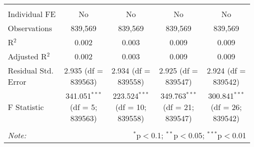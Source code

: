 \documentclass[
]{article}
\begin{document}
\begin{table}[!htbp]
{\begin{tabular}{@{\extracolsep{5pt}}lcccc}
  & & & & \\ 
\hline \\[-1.8ex] 
Individual FE & No & No & No & No \\ 
Observations & 839,569 & 839,569 & 839,569 & 839,569 \\ 
R$^{2}$ & 0.002 & 0.003 & 0.009 & 0.009 \\ 
Adjusted R$^{2}$ & 0.002 & 0.003 & 0.009 & 0.009 \\ 
Residual Std. Error & 2.935 (df = 839563) & 2.934 (df = 839558) & 2.925 (df = 839547) & 2.924 (df = 839542) \\ 
F Statistic & 341.051$^{***}$ (df = 5; 839563) & 223.524$^{***}$ (df = 10; 839558) & 349.763$^{***}$ (df = 21; 839547) & 300.841$^{***}$ (df = 26; 839542) \\ 
\hline 
\hline \\[-1.8ex] 
\textit{Note:}  & \multicolumn{4}{r}{$^{*}$p$<$0.1; $^{**}$p$<$0.05; $^{***}$p$<$0.01} \\ 
\end{tabular}
} 
\end{table} 
\newpage
\end{document}
